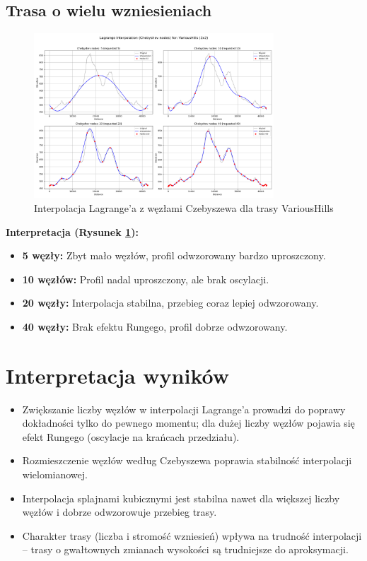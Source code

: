 \documentclass[11pt,a4paper]{article}
\begin{document}
\subsection{Trasa o wielu wzniesieniach}
\begin{figure}[H]
    \centering
    \includegraphics[width=0.8\textwidth]{plots/VariousHills_Lagrange_Chebyshev_2x2.png}
    \caption{Interpolacja Lagrange'a z węzłami Czebyszewa dla trasy VariousHills}
    \label{fig:wiele_wzniesien}
\end{figure}
\textbf{Interpretacja (Rysunek \ref{fig:wiele_wzniesien}):} 
\begin{itemize}
    \item \textbf{5 węzły:} Zbyt mało węzłów, profil odwzorowany bardzo uproszczony.
    \item \textbf{10 węzłów:} Profil nadal uproszczony, ale brak oscylacji.
    \item \textbf{20 węzły:} Interpolacja stabilna, przebieg coraz lepiej odwzorowany.
    \item \textbf{40 węzły:} Brak efektu Rungego, profil dobrze odwzorowany.
\end{itemize}

\newpage
\section{Interpretacja wyników}
\begin{itemize}
    \item Zwiększanie liczby węzłów w interpolacji Lagrange'a prowadzi do poprawy dokładności tylko do pewnego momentu; dla dużej liczby węzłów pojawia się efekt Rungego (oscylacje na krańcach przedziału).
    \item Rozmieszczenie węzłów według Czebyszewa poprawia stabilność interpolacji wielomianowej.
    \item Interpolacja splajnami kubicznymi jest stabilna nawet dla większej liczby węzłów i dobrze odwzorowuje przebieg trasy.
    \item Charakter trasy (liczba i stromość wzniesień) wpływa na trudność interpolacji -- trasy o gwałtownych zmianach wysokości są trudniejsze do aproksymacji.
\end{itemize}
\end{document}
